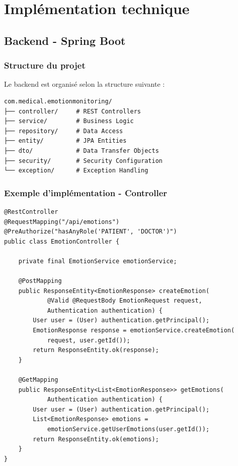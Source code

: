 \documentclass[a4paper,11pt]{report}
\begin{document}
\chapter{Implémentation technique}

\section{Backend - Spring Boot}

\subsection{Structure du projet}

Le backend est organisé selon la structure suivante :

\begin{lstlisting}[style=java, caption=Structure des packages Spring Boot]
com.medical.emotionmonitoring/
├── controller/     # REST Controllers
├── service/        # Business Logic
├── repository/     # Data Access
├── entity/         # JPA Entities
├── dto/            # Data Transfer Objects
├── security/       # Security Configuration
└── exception/      # Exception Handling
\end{lstlisting}

\subsection{Exemple d'implémentation - Controller}

\begin{lstlisting}[style=java, caption=Exemple de Controller REST]
@RestController
@RequestMapping("/api/emotions")
@PreAuthorize("hasAnyRole('PATIENT', 'DOCTOR')")
public class EmotionController {
    
    private final EmotionService emotionService;
    
    @PostMapping
    public ResponseEntity<EmotionResponse> createEmotion(
            @Valid @RequestBody EmotionRequest request,
            Authentication authentication) {
        User user = (User) authentication.getPrincipal();
        EmotionResponse response = emotionService.createEmotion(
            request, user.getId());
        return ResponseEntity.ok(response);
    }
    
    @GetMapping
    public ResponseEntity<List<EmotionResponse>> getEmotions(
            Authentication authentication) {
        User user = (User) authentication.getPrincipal();
        List<EmotionResponse> emotions = 
            emotionService.getUserEmotions(user.getId());
        return ResponseEntity.ok(emotions);
    }
}
\end{lstlisting}
\end{document}
